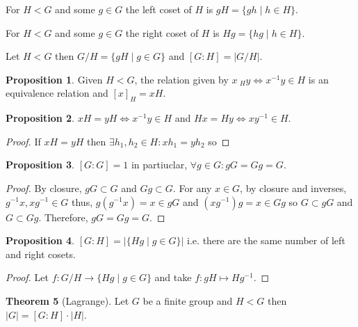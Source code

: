 \documentclass[12pt]{extarticle}
\renewcommand\qedsymbol{$\square$}
\theoremstyle{definition}
\newtheorem{theorem}{Theorem}[section]
\newtheorem{proposition}[theorem]{Proposition}
\newenvironment{definition}[1][Definition:]{\begin{trivlist}
\item[\hskip \labelsep {\bfseries #1}]}{\end{trivlist}}
\newenvironment{lproof}{\begin{proof} \renewcommand{\qedsymbol}{}}{\end{proof}}
\begin{document}
\begin{definition}
For $H < G$ and some $g \in G$ the left coset of $H$ is $gH = \{g h \mid h \in H \}$.
\end{definition}

\begin{definition}
For $H < G$ and some $g \in G$ the right coset of $H$ is $Hg = \{hg \mid h \in H \}$.
\end{definition}

\begin{definition}
Let $H < G$ then $G / H = \{gH \mid g \in G\}$ and $[G : H] = \left| G/H \right|$.
\end{definition}

\begin{proposition}
Given $H < G$, the relation given by $x ~_H y \iff x^{-1}y \in H$ is an equivalence relation and $[x]_H = xH$.
\end{proposition}

\begin{proposition}
$xH = yH \iff x^{-1}y \in H$ and $Hx = Hy \iff xy^{-1} \in H$. 
\end{proposition}

\begin{lproof}
If $xH = yH$ then $\exists h_1, h_2 \in H : x h_1 = y h_2$ so 
\end{lproof}

\begin{proposition}
$[G : G] = 1$ in partiuclar, $\forall g \in G : gG = Gg = G$.
\end{proposition}

\begin{lproof}
By closure, $gG \subset G$ and $Gg \subset G$. For any $x \in G$, by closure and inverses, $g^{-1}x, xg^{-1} \in G$ thus, $g(g^{-1}x) = x \in gG$ and $(x g^{-1})g = x \in Gg$ so $G \subset gG$ and $G \subset Gg$. Therefore, $gG = Gg = G$. 
\end{lproof}

\begin{proposition}
$[G : H] = \left| \{ Hg \mid g \in G \} \right|$ i.e. there are the same number of left and right cosets. 
\end{proposition}

\begin{lproof}
Let $f : G/H \rightarrow \{ Hg \mid g \in G \}$ and take $f : gH \mapsto Hg^{-1}$.
\end{lproof}

\begin{theorem}[Lagrange]
Let $G$ be a finite group and $H < G$ then $|G| = [G:H] \cdot |H|$.
\end{theorem}
\end{document}
